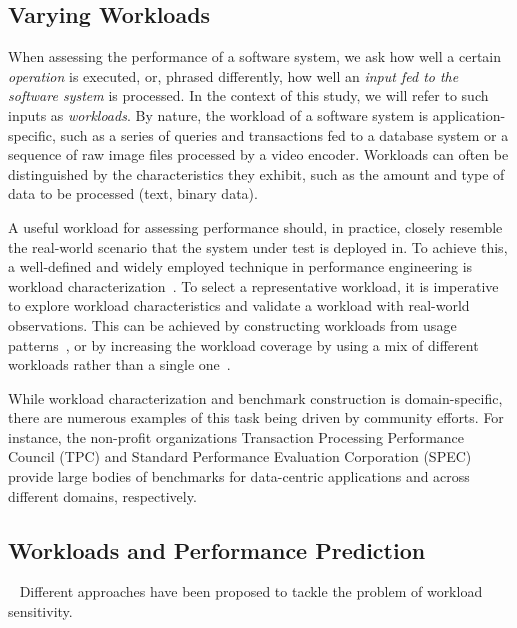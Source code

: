 {\color{black}
\subsection{Varying Workloads}\label{sec:varying_workloads}
When assessing the performance of a software system, we ask how well a certain \textit{operation} is executed, or, phrased differently, how well an \textit{input fed to the software system} is processed. 
{\color{brown}In the context of this study, we will refer to such inputs as \textit{workloads}.} By nature, the workload of a software system is application-specific, such as a series of queries and transactions fed to a database system or a sequence of raw image files processed by a video encoder. Workloads can often be distinguished by the characteristics they exhibit, such as the amount and type of data to be processed (text, binary data).

A useful workload for assessing performance should, in practice, closely resemble the real-world scenario that the system under test is deployed in. To achieve this, a well-defined and widely employed technique in performance engineering is workload characterization~\cite{ceesay2020,papadopoulos2021}. To select a representative workload, it is imperative to explore workload characteristics and validate a workload with real-world observations. This can be achieved by constructing workloads from usage patterns~\cite{calzarossa2016}, or by increasing the workload coverage by using a mix of different workloads rather than a single one~\cite{jiang2015survey}.

While workload characterization and benchmark construction is domain-specific, there are numerous examples of this task being driven by community efforts. For instance, the non-profit organizations Transaction Processing Performance Council (TPC) and Standard Performance Evaluation Corporation (SPEC) provide large bodies of benchmarks for data-centric applications and across different domains, respectively.
	
\subsection{Workloads and Performance Prediction} ~\label{sec:strategies}
Different approaches have been proposed to tackle the problem of workload sensitivity.

}
